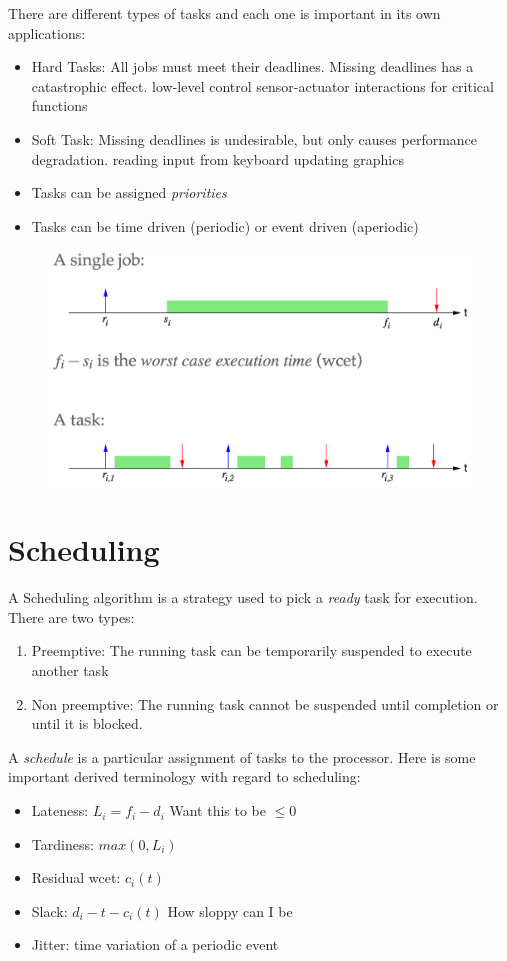 \documentclass{hw}
\begin{document}
There are different types of tasks and each one is important in its own
applications:
\begin{itemize}
  \item Hard Tasks: All jobs must meet their deadlines. Missing deadlines has 
    a catastrophic effect.
    \subitem low-level control
    \subitem sensor-actuator interactions for critical functions
  \item Soft Task: Missing deadlines is undesirable, but only causes performance
    degradation.
    \subitem reading input from keyboard
    \subitem updating graphics
  \item Tasks can be assigned \emph{priorities}
  \item Tasks can be time driven (periodic) or event driven (aperiodic)
\end{itemize}

\begin{figure}[H]
  \centering
  \includegraphics[scale=.5]{jobtask}
\end{figure}

\section{Scheduling}
A Scheduling algorithm is a strategy used to pick a \emph{ready} task for 
execution. There are two types:
\begin{enumerate}
  \item Preemptive: The running task can be temporarily suspended to execute 
    another task
  \item Non preemptive: The running task cannot be suspended until completion or
    until it is blocked.
\end{enumerate}
A \emph{schedule} is a particular assignment of tasks to the processor. Here is 
some important derived terminology with regard to scheduling:
\begin{itemize}
  \item Lateness: $L_{i} = f_{i} - d_{i} $ Want this to be $\leq 0$
  \item Tardiness: $max(0,L_{i})$
  \item Residual wcet: $c_{i}(t)$
  \item Slack: $d_{i} - t - c_{i}(t)$  How sloppy can I be
  \item Jitter: time variation of a periodic event
\end{itemize}
\end{document}
